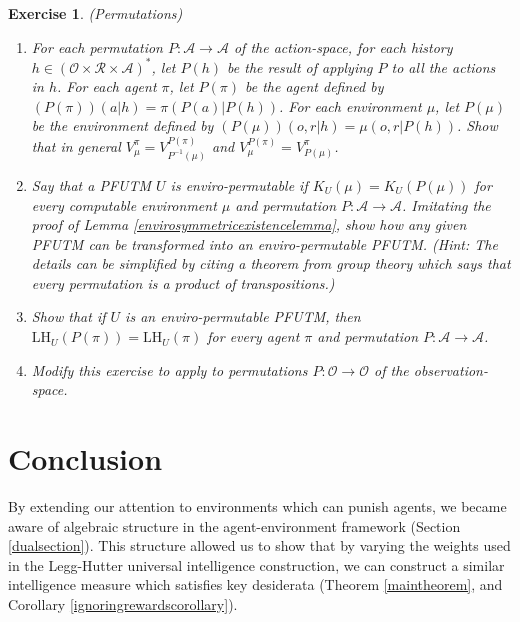 \documentclass{article}
\newtheorem{exercise}[theorem]{Exercise}
\def\LH{\textrm{LH}}
\begin{document}
\begin{exercise} (Permutations)
    \begin{enumerate}
        \item
        For each permutation $P:\mathcal A\to\mathcal A$ of the action-space,
        for each history $h\in (\mathcal O\times\mathcal R\times\mathcal A)^*$,
        let $P(h)$ be the result of applying $P$ to all the actions in $h$.
        For each agent $\pi$, let $P(\pi)$ be the agent defined by
        $(P(\pi))(a|h)=\pi(P(a)|P(h))$. For each environment $\mu$, let
        $P(\mu)$ be the environment defined by
        $(P(\mu))(o,r|h)=\mu(o,r|P(h))$. Show that in general
        $V^\pi_\mu = V^{P(\pi)}_{P^{-1}(\mu)}$
        and
        $V^{P(\pi)}_\mu = V^\pi_{P(\mu)}$.
        \item
        Say that a PFUTM $U$ is \emph{enviro-permutable} if
        $K_U(\mu)=K_U(P(\mu))$ for every computable environment $\mu$
        and permutation $P:\mathcal A\to\mathcal A$. Imitating the proof of
        Lemma \ref{envirosymmetricexistencelemma}, show how any given
        PFUTM can be transformed into an enviro-permutable PFUTM.
        (Hint: The details can be simplified by citing a theorem from group
        theory which says that every permutation is a product of transpositions.)
        \item
        Show that if $U$ is an enviro-permutable PFUTM, then $\LH_U(P(\pi))=\LH_U(\pi)$
        for every agent $\pi$ and permutation $P:\mathcal A\to\mathcal A$.
        \item
        Modify this exercise to apply to permutations $P:\mathcal O\to\mathcal O$
        of the observation-space.
    \end{enumerate}
\end{exercise}

\section{Conclusion}
\label{conclusionsecn}

By extending our attention to environments which can punish agents,
we became aware of algebraic structure in the agent-environment
framework (Section \ref{dualsection}). This structure allowed us to
show that by varying the weights used in the Legg-Hutter universal
intelligence construction, we can construct a similar intelligence
measure which satisfies key desiderata (Theorem \ref{maintheorem},
and Corollary \ref{ignoringrewardscorollary}).
\end{document}
